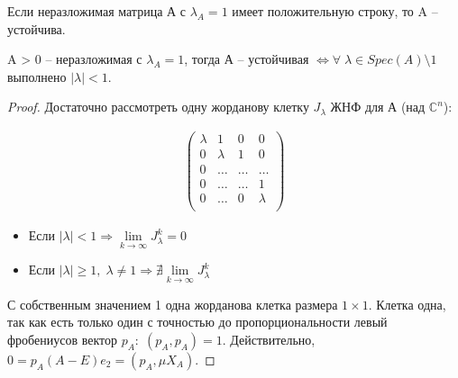 \begin{conseq}
	Если неразложимая матрица А с $\lambda_A = 1$ имеет положительную строку, то A -- устойчива.
\end{conseq}

\begin{theorem}
	A > 0 -- неразложимая с $\lambda_A = 1$, тогда А -- устойчивая $ \Longleftrightarrow \forall \; \lambda \in Spec(A) \setminus 1$ выполнено $|\lambda| < 1.$
\end{theorem}

\begin{proof}
	Достаточно рассмотреть одну жорданову клетку $J_{\lambda}$ ЖНФ для А (над $\mathbb{C}^n$):

	\begin{gather*}
		\begin{pmatrix}
		  \lambda & 1 & 0 & 0\\
		  0 & \lambda & 1 & 0\\
		  0 & \ldots & \ldots & \ldots\\
		  0 & \ldots & \ldots & 1\\
		  0 & \ldots & 0 &  \lambda \\
		\end{pmatrix}
	\end{gather*}

	\begin{itemize}
		\item Если $|\lambda| < 1 \Rightarrow \lim \limits_{k \to \infty}J_{\lambda}^k = 0$
		\item Если $|\lambda| \geq 1, \; \lambda \neq 1 \Rightarrow \nexists \lim \limits_{k \to \infty}J_{\lambda}^k$
	\end{itemize}

	С собственным значением 1 одна жорданова клетка размера $1 \times 1.$ Клетка одна, так как есть только один с точностью до пропорциональности левый фробениусов вектор $p_A: \; (p_A, p_A) = 1.$ Действительно, $0 = p_A(A - E)e_2 = (p_A, \mu X_A).$
\end{proof}